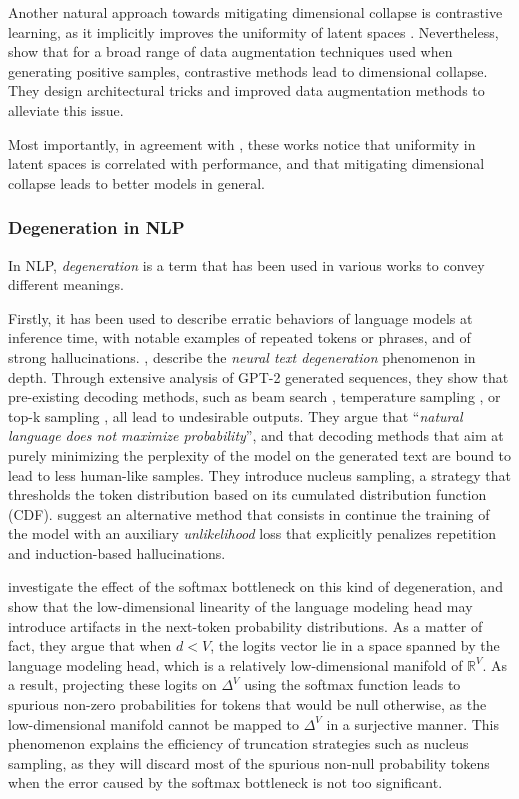 Another natural approach towards mitigating dimensional collapse is contrastive learning, as it implicitly improves the uniformity of latent spaces \citep{pmlr-v119-wang20k}. Nevertheless, \citet{jing2022understanding} show that for a broad range of data augmentation techniques used when generating positive samples, contrastive methods lead to dimensional collapse. They design architectural tricks and improved data augmentation methods to alleviate this issue.

Most importantly, in agreement with \citet{pmlr-v119-wang20k}, these works notice that uniformity in latent spaces is correlated with performance, and that mitigating dimensional collapse leads to better models in general.

\subsubsection{Degeneration in NLP}
\label{ssec:degeneration}

In NLP, \textit{degeneration} is a term that has been used in various works to convey different meanings. 

Firstly, it has been used to describe erratic behaviors of language models at inference time, with notable examples of repeated tokens or phrases, and of strong hallucinations. \citet{Holtzman2020The}, describe the \textit{neural text degeneration} phenomenon in depth. Through extensive analysis of GPT-2 generated sequences, they show that pre-existing decoding methods, such as beam search \citep{freitag-al-onaizan-2017-beam}, temperature sampling \citep{ACKLEY1985147}, or top-k sampling \citep{gpt2}, all lead to undesirable outputs. They argue that ``\textit{natural language does not maximize probability}'', and that decoding methods that aim at purely minimizing the perplexity of the model on the generated text are bound to lead to less human-like samples. They introduce nucleus sampling, a strategy that thresholds the token distribution based on its cumulated distribution function (CDF). \citet{Welleck2020Neural} suggest an alternative method that consists in continue the training of the model with an auxiliary \textit{unlikelihood} loss that explicitly penalizes repetition and induction-based hallucinations.

\citet{finlayson2024closing} investigate the effect of the softmax bottleneck on this kind of degeneration, and show that the low-dimensional linearity of the language modeling head may introduce artifacts in the next-token probability distributions. As a matter of fact, they argue that when $d < V$, the logits vector lie in a space spanned by the language modeling head, which is a relatively low-dimensional manifold of $\mathbb{R}^V$. As a result, projecting these logits on $\Delta^V$ using the softmax function leads to spurious non-zero probabilities for tokens that would be null otherwise, as the low-dimensional manifold cannot be mapped to $\Delta^V$ in a surjective manner. This phenomenon explains the efficiency of truncation strategies such as nucleus sampling, as they will discard most of the spurious non-null probability tokens when the error caused by the softmax bottleneck is not too significant.

